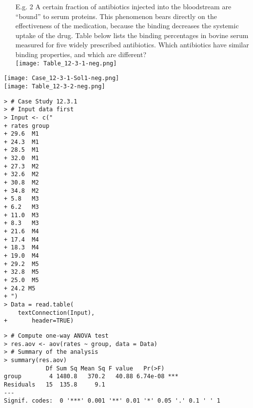 \begin{frame}
	\begin{enumerate}
		\item[E.g. 2] A certain fraction of antibiotics injected into the bloodstream are ``bound'' to
serum proteins. This phenomenon bears directly on the effectiveness of the
medication, because the binding decreases the systemic uptake of the drug.
Table below lists the binding percentages in bovine serum measured for five
widely prescribed antibiotics. Which antibiotics have similar binding
properties, and which are different? \\[1em]
\texttt{[image: Table\_12-3-1-neg.png]}
	\end{enumerate}
\end{frame}
\begin{frame}[fragile]
	\texttt{[image: Case\_12-3-1-Sol1-neg.png]}\\
	\vfill
	\texttt{[image: Table\_12-3-2-neg.png]}
\end{frame}
\begin{frame}[fragile]
	\begin{minipage}{0.3\textwidth}
	\begin{lstlisting}
> # Case Study 12.3.1
> # Input data first
> Input <- c("
+ rates group
+ 29.6  M1
+ 24.3  M1
+ 28.5  M1
+ 32.0  M1
+ 27.3  M2
+ 32.6  M2
+ 30.8  M2
+ 34.8  M2
+ 5.8   M3
+ 6.2   M3
+ 11.0  M3
+ 8.3   M3
+ 21.6  M4
+ 17.4  M4
+ 18.3  M4
+ 19.0  M4
+ 29.2  M5
+ 32.8  M5
+ 25.0  M5
+ 24.2 M5
+ ")
> Data = read.table(
 	textConnection(Input),
+       header=TRUE)
	\end{lstlisting}
	\end{minipage}
	\begin{minipage}{0.63\textwidth}
	\begin{lstlisting}
> # Compute one-way ANOVA test
> res.aov <- aov(rates ~ group, data = Data)
> # Summary of the analysis
> summary(res.aov)
            Df Sum Sq Mean Sq F value   Pr(>F)
group        4 1480.8   370.2   40.88 6.74e-08 ***
Residuals   15  135.8     9.1
---
Signif. codes:  0 '***' 0.001 '**' 0.01 '*' 0.05 '.' 0.1 ' ' 1
	\end{lstlisting}
	\end{minipage}

\end{frame}
